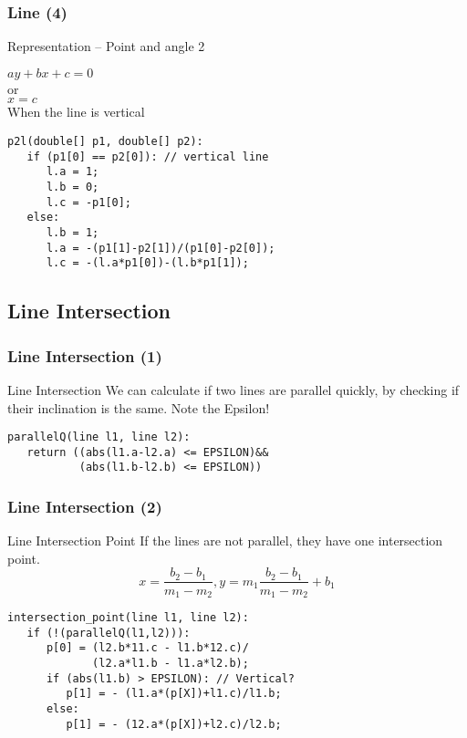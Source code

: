 \documentclass{beamer}
\begin{document}
\begin{frame}
  \frametitle{Line (4)}
  \begin{block}{Representation -- Point and angle 2}
    \begin{center}
      $ay + bx + c = 0$\\
      or\\
      $x = c$\\
      When the line is vertical
    \end{center}
  \end{block}
\begin{verbatim}
p2l(double[] p1, double[] p2):
   if (p1[0] == p2[0]): // vertical line
      l.a = 1;
      l.b = 0;
      l.c = -p1[0];
   else:
      l.b = 1;
      l.a = -(p1[1]-p2[1])/(p1[0]-p2[0]);
      l.c = -(l.a*p1[0])-(l.b*p1[1]);
\end{verbatim}
\end{frame}

\subsection{Line Intersection}
\begin{frame}
  \frametitle{Line Intersection (1)}
  \begin{block}{Line Intersection}
    We can calculate if two lines are parallel quickly, by checking if
    their inclination is the same. Note the Epsilon!
  \end{block}
  \smallskip
{\smaller
\begin{verbatim}
parallelQ(line l1, line l2):
   return ((abs(l1.a-l2.a) <= EPSILON)&&
           (abs(l1.b-l2.b) <= EPSILON))
\end{verbatim}
}
\end{frame}

\begin{frame}
  \frametitle{Line Intersection (2)}
  \begin{block}{Line Intersection Point}
    If the lines are not parallel, they have one intersection point.
    \begin{equation*}
      x = \frac{b_2 - b_1}{m_1 - m_2}, y = m_1\frac{b_2-b_1}{m_1-m_2} + b_1
    \end{equation*}
  \end{block}
  \smallskip
{\smaller
\begin{verbatim}
intersection_point(line l1, line l2):
   if (!(parallelQ(l1,l2))):
      p[0] = (l2.b*11.c - l1.b*12.c)/
             (l2.a*l1.b - l1.a*l2.b);
      if (abs(l1.b) > EPSILON): // Vertical?
         p[1] = - (l1.a*(p[X])+l1.c)/l1.b;
      else:
         p[1] = - (12.a*(p[X])+l2.c)/l2.b;
\end{verbatim}
}
\end{frame}
\end{document}
